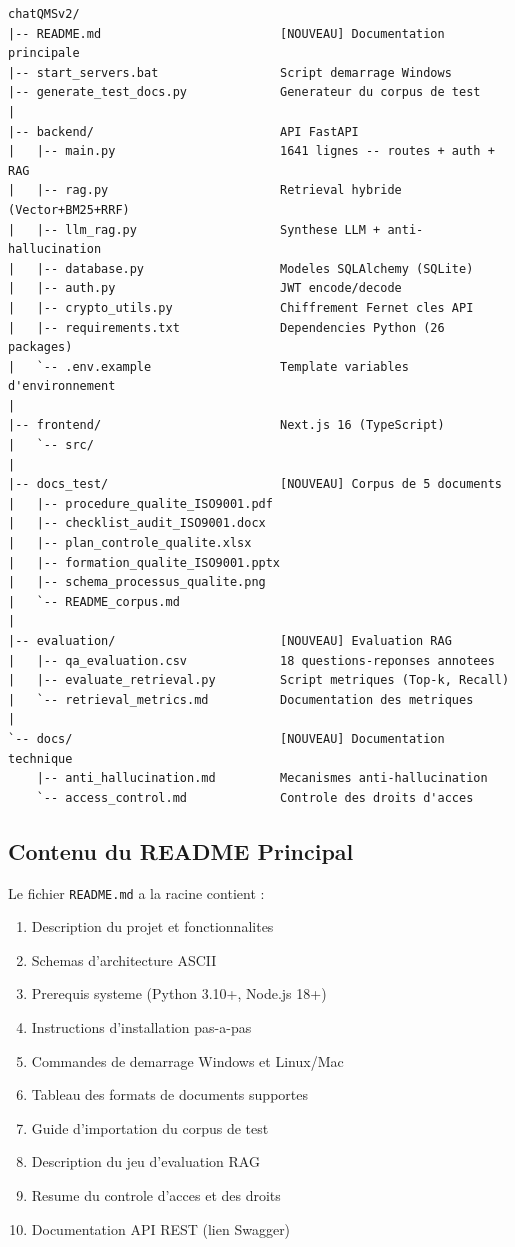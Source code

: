 \documentclass[12pt,a4paper]{article}
\begin{document}
\begin{verbatim}
chatQMSv2/
|-- README.md                         [NOUVEAU] Documentation principale
|-- start_servers.bat                 Script demarrage Windows
|-- generate_test_docs.py             Generateur du corpus de test
|
|-- backend/                          API FastAPI
|   |-- main.py                       1641 lignes -- routes + auth + RAG
|   |-- rag.py                        Retrieval hybride (Vector+BM25+RRF)
|   |-- llm_rag.py                    Synthese LLM + anti-hallucination
|   |-- database.py                   Modeles SQLAlchemy (SQLite)
|   |-- auth.py                       JWT encode/decode
|   |-- crypto_utils.py               Chiffrement Fernet cles API
|   |-- requirements.txt              Dependencies Python (26 packages)
|   `-- .env.example                  Template variables d'environnement
|
|-- frontend/                         Next.js 16 (TypeScript)
|   `-- src/
|
|-- docs_test/                        [NOUVEAU] Corpus de 5 documents
|   |-- procedure_qualite_ISO9001.pdf
|   |-- checklist_audit_ISO9001.docx
|   |-- plan_controle_qualite.xlsx
|   |-- formation_qualite_ISO9001.pptx
|   |-- schema_processus_qualite.png
|   `-- README_corpus.md
|
|-- evaluation/                       [NOUVEAU] Evaluation RAG
|   |-- qa_evaluation.csv             18 questions-reponses annotees
|   |-- evaluate_retrieval.py         Script metriques (Top-k, Recall)
|   `-- retrieval_metrics.md          Documentation des metriques
|
`-- docs/                             [NOUVEAU] Documentation technique
    |-- anti_hallucination.md         Mecanismes anti-hallucination
    `-- access_control.md             Controle des droits d'acces
\end{verbatim}

\subsection{Contenu du README Principal}

Le fichier \texttt{README.md} a la racine contient :

\begin{enumerate}
  \item Description du projet et fonctionnalites
  \item Schemas d'architecture ASCII
  \item Prerequis systeme (Python 3.10+, Node.js 18+)
  \item Instructions d'installation pas-a-pas
  \item Commandes de demarrage Windows et Linux/Mac
  \item Tableau des formats de documents supportes
  \item Guide d'importation du corpus de test
  \item Description du jeu d'evaluation RAG
  \item Resume du controle d'acces et des droits
  \item Documentation API REST (lien Swagger)
\end{enumerate}
\end{document}
